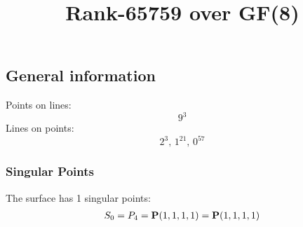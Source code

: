 \documentclass{article}
\newcommand\setTBstruts{\def\T{\rule{0pt}{2.6ex}}%
\def\B{\rule[-1.2ex]{0pt}{0pt}}}
\newcommand{\bP}{{\bf P}}
\begin{document}
 
\setTBstruts



{\allowdisplaybreaks%






\title{Rank-65759 over GF(8)}
\author{}%
\maketitle%
%
{}



\subsection*{General information}
Points on lines:
$$
9^3$$
Lines on points:
$$
2^3,\,1^{21},\,0^{57}$$
\subsubsection*{Singular Points}
The surface has 1 singular points:\\
\begin{align*}
S_{0} &= P_{4}=\bP(1, 1, 1, 1) = \bP(1, 1, 1, 1)\\
\end{align*}
}
\end{document}
